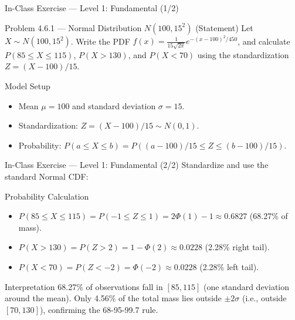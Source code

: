 \documentclass[aspectratio=169,xcolor={dvipsnames,table}]{beamer}
\begin{document}
\begin{frame}{In-Class Exercise --- Level 1: Fundamental (1/2)}
	\vspace{-0.1cm}
	\begin{block}{Problem 4.6.1 --- Normal Distribution $N(100, 15^{2})$ (Statement)}
		Let $X \sim N(100, 15^{2})$. Write the PDF $f(x) = \frac{1}{15\sqrt{2\pi}} e^{-(x-100)^{2}/450}$, and calculate $P(85 \le X \le 115)$, $P(X > 130)$, and $P(X < 70)$ using the standardization $Z = (X - 100)/15$.
	\end{block}
	\vspace{0.15cm}
	\pause
	\begin{alertblock}{Model Setup}
		\begin{itemize}\itemsep=0.04cm
			\item Mean $\mu = 100$ and standard deviation $\sigma = 15$.
			\item Standardization: $Z = (X - 100)/15 \sim N(0, 1)$.
			\item Probability: $P(a \le X \le b) = P((a-100)/15 \le Z \le (b-100)/15)$.
		\end{itemize}
	\end{alertblock}
\end{frame}

\begin{frame}{In-Class Exercise --- Level 1: Fundamental (2/2)}
	\vspace{-0.05cm}
	\scriptsize
	Standardize and use the standard Normal CDF: \pause
	\begin{block}{Probability Calculation}
		\begin{itemize}\itemsep=0.05cm
			\item $P(85 \le X \le 115) = P(-1 \le Z \le 1) = 2\Phi(1) - 1 \approx 0.6827$ (68.27\% of mass).
			\item $P(X > 130) = P(Z > 2) = 1 - \Phi(2) \approx 0.0228$ (2.28\% right tail).
			\item $P(X < 70) = P(Z < -2) = \Phi(-2) \approx 0.0228$ (2.28\% left tail).
		\end{itemize}
	\end{block}
	\vspace{0.05cm}
	\pause
	\begin{alertblock}{Interpretation}
		\scriptsize
		68.27\% of observations fall in $[85, 115]$ (one standard deviation around the mean). Only 4.56\% of the total mass lies outside $\pm 2\sigma$ (i.e., outside $[70, 130]$), confirming the 68-95-99.7 rule.
	\end{alertblock}
\end{frame}
\end{document}
